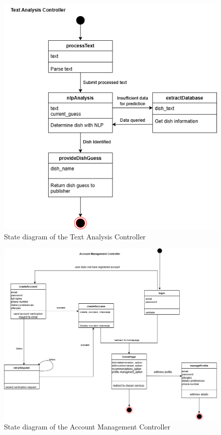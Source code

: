 \documentclass[]{article}
\begin{document}
\begin{figure}[H]
	\centering
	\includegraphics[width=\textwidth]{image/D3_state_diagrams/text_analysis.png}
	\caption{State diagram of the Text Analysis Controller}
	\label{fig:text_analysis_controller}
\end{figure}


\begin{figure}[H]
	\centering
	\includegraphics[width=\textwidth]{image/D3_state_diagrams/account_management.png}
	\caption{State diagram of the Account Management Controller}
	\label{fig:account_management_controller}
\end{figure}
\end{document}
